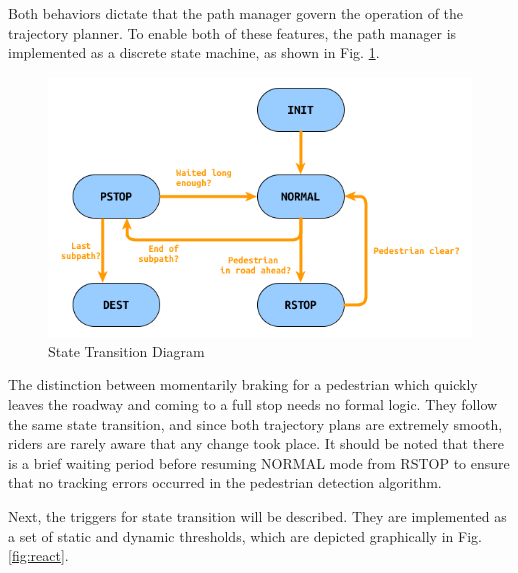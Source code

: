 \documentclass[letterpaper, 10 pt, conference]{ieeeconf}  %
\begin{document}
Both behaviors dictate that the path manager govern the operation of the trajectory planner.
To enable both of these features, the path manager is implemented as a discrete state machine, as shown in Fig. \ref{fig:st}.

\begin{figure}[thpb]
  \centering
  \includegraphics[width=1.0\columnwidth]{graphics/StateMachineSimple.png}
  \caption{State Transition Diagram}
  \label{fig:st}
\end{figure}

The distinction between momentarily braking for a pedestrian which quickly leaves the roadway and coming to a full stop needs no formal logic.
They follow the same state transition, and since both trajectory plans are extremely smooth, riders are rarely aware that any change took place.
It should be noted that there is a brief waiting period before resuming NORMAL mode from RSTOP to ensure that no tracking errors occurred in the pedestrian detection algorithm.

Next, the triggers for state transition will be described.
They are implemented as a set of static and dynamic thresholds, which are depicted graphically in Fig. \ref{fig:react}.
\end{document}

